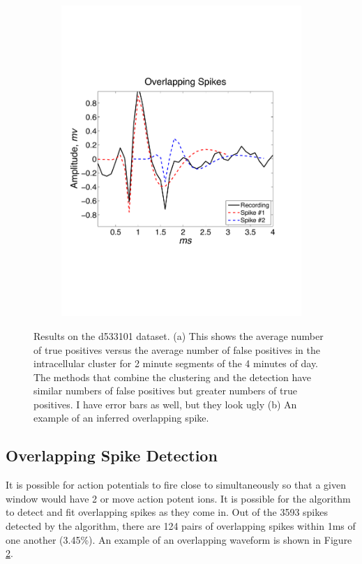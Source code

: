 \begin{center}
\begin{figure}
\begin{subfigure}[b]{.49\textwidth}
\includegraphics[width=\textwidth]{../figs/alloverlappingspikes/olspike3}
\caption{}
\label{overlapping}
\end{subfigure}
\caption{Results on the d533101 dataset.  (a) This shows the average number of true positives versus the average number of false positives in the intracellular cluster for 2 minute segments of the 4 minutes of day.  The methods that combine the clustering and the detection have similar numbers of false positives but greater numbers of true positives. {\color{red} I have error bars as well, but they look ugly}  (b) An example of an inferred overlapping spike. 
}
\end{figure}
\end{center}


\subsection{Overlapping Spike Detection}
It is possible for action potentials to fire close to simultaneously so that a given window would have 2 or move action potent ions.  It is possible for the algorithm to detect and fit overlapping spikes as they come in.  Out of the 3593 spikes detected by the algorithm, there are 124 pairs of overlapping spikes within 1ms of one another (3.45\%).  An example of an overlapping waveform is shown in Figure \ref{overlapping}.




